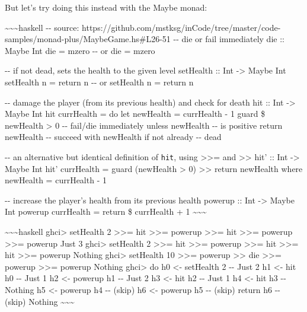 \documentclass[]{article}
\begin{document}
But let's try doing this instead with the Maybe monad:

\textasciitilde{}\textasciitilde{}\textasciitilde{}haskell -\/- source:
https://github.com/mstksg/inCode/tree/master/code-samples/monad-plus/MaybeGame.hs\#L26-51
-\/- die or fail immediately die :: Maybe Int die = mzero -\/- or die = mzero

-\/- if not dead, sets the health to the given level setHealth :: Int
-\textgreater{} Maybe Int setHealth n = return n -\/- or setHealth n = return n

-\/- damage the player (from its previous health) and check for death hit :: Int
-\textgreater{} Maybe Int hit currHealth = do let newHealth = currHealth - 1
guard \$ newHealth \textgreater{} 0 -\/- fail/die immediately unless newHealth
-\/- is positive return newHealth -\/- succeed with newHealth if not already
-\/- dead

-\/- an alternative but identical definition of \texttt{hit}, using
\textgreater{}\textgreater{}= and \textgreater{}\textgreater{} hit' :: Int
-\textgreater{} Maybe Int hit' currHealth = guard (newHealth \textgreater{} 0)
\textgreater{}\textgreater{} return newHealth where newHealth = currHealth - 1

-\/- increase the player's health from its previous health powerup :: Int
-\textgreater{} Maybe Int powerup currHealth = return \$ currHealth + 1
\textasciitilde{}\textasciitilde{}\textasciitilde{}

\textasciitilde{}\textasciitilde{}\textasciitilde{}haskell ghci\textgreater{}
setHealth 2 \textgreater{}\textgreater{}= hit \textgreater{}\textgreater{}=
powerup \textgreater{}\textgreater{}= hit \textgreater{}\textgreater{}= powerup
\textgreater{}\textgreater{}= powerup Just 3 ghci\textgreater{} setHealth 2
\textgreater{}\textgreater{}= hit \textgreater{}\textgreater{}= powerup
\textgreater{}\textgreater{}= hit \textgreater{}\textgreater{}= hit
\textgreater{}\textgreater{}= powerup Nothing ghci\textgreater{} setHealth 10
\textgreater{}\textgreater{}= powerup \textgreater{}\textgreater{} die
\textgreater{}\textgreater{}= powerup \textgreater{}\textgreater{}= powerup
Nothing ghci\textgreater{} do h0 \textless{}- setHealth 2 -\/- Just 2 \textbar{}
h1 \textless{}- hit h0 -\/- Just 1 \textbar{} h2 \textless{}- powerup h1 -\/-
Just 2 \textbar{} h3 \textless{}- hit h2 -\/- Just 1 \textbar{} h4 \textless{}-
hit h3 -\/- Nothing \textbar{} h5 \textless{}- powerup h4 -\/- (skip) \textbar{}
h6 \textless{}- powerup h5 -\/- (skip) \textbar{} return h6 -\/- (skip) Nothing
\textasciitilde{}\textasciitilde{}\textasciitilde{}
\end{document}

